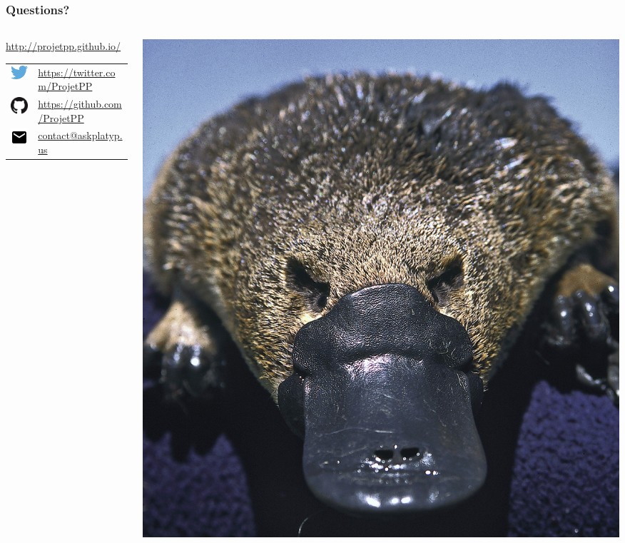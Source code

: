 \newlength{\logosize}
\setlength{\logosize}{12pt}
\begin{frame}
    \frametitle{Questions?}
    
    \begin{columns}
    \begin{column}{0.55\textwidth}
        \alert{\url{http://projetpp.github.io/}}\vspace{5pt}
        \begin{tabular}{ll}
            \includegraphics[width=\logosize]{Twitter_logo_blue.png} & \href{https://twitter.com/ProjetPP}{https://twitter.com/ProjetPP}\\
            \includegraphics[width=\logosize]{GitHub-Mark-32px.png} &  \href{https://github.com/ProjetPP}{https://github.com/ProjetPP}\\
            \includegraphics[width=\logosize]{ic_email_black_18dp.png} & \href{mailto:askplatyp.us}{contact@askplatyp.us}\\
        \end{tabular}
    \end{column}
    \begin{column}{0.5\textwidth}
        \includegraphics[width=\linewidth]{figures/Ornithorhynchus.jpg}
    \end{column}
    \end{columns}
\end{frame}

